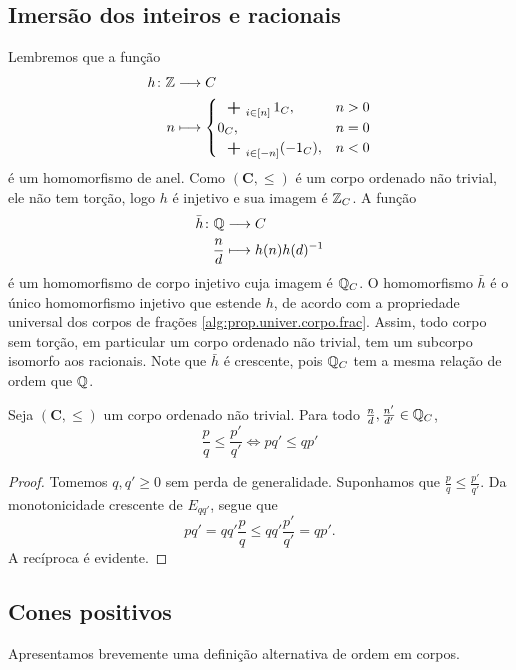 \subsection{Imersão dos inteiros e racionais}

Lembremos que a função
	\begin{align*}
	\func{h}{\Z}{C}{n}{
		\begin{cases}
			\sum_{i \in [n]} 1_C,& n>0 \\
			0_C,& n=0 \\
			\sum_{i \in [-n]} (-1_C),& n<0
		\end{cases}
	}
	\end{align*}
é um homomorfismo de anel. Como $(\bm C,\leq)$ é um corpo ordenado não trivial, ele não tem torção, logo $h$ é injetivo e sua imagem é $\mathbb{Z}_C$. A função
	\begin{align*}
	{\bar h}\colon {\mathbb{Q}} &\longrightarrow {C} \\{\frac{n}{d}} &\longmapsto h(n)h(d)^{-1}
	\end{align*}
é um homomorfismo de corpo injetivo cuja imagem é $\mathbb{Q}_C$. O homomorfismo $\bar h$ é o único homomorfismo injetivo que estende $h$, de acordo com a propriedade universal dos corpos de frações \ref{alg:prop.univer.corpo.frac}. Assim, todo corpo sem torção, em particular um corpo ordenado não trivial, tem um subcorpo isomorfo aos racionais. 	Note que $\bar h$ é crescente, pois $\mathbb{Q}_C$ tem a mesma relação de ordem que $\mathbb{Q}$.

\begin{proposition}
Seja $(\bm C,\leq)$ um corpo ordenado não trivial. Para todo $\frac{n}{d},\frac{n'}{d'} \in \mathbb{Q}_C$,
	\begin{equation*}
	\frac{p}{q} \leq \frac{p'}{q'} \Leftrightarrow pq' \leq qp'
	\end{equation*}
\end{proposition}
\begin{proof}
Tomemos $q,q' \geq 0$ sem perda de generalidade. Suponhamos que $\frac{p}{q} \leq \frac{p'}{q'}$. Da monotonicidade crescente de $E_{qq'}$, segue que
	\begin{equation*}
	pq' = qq'\frac{p}{q} \leq qq'\frac{p'}{q'} = qp'.
	\end{equation*}
A recíproca é evidente.
\end{proof}


\subsection{Cones positivos}

Apresentamos brevemente uma definição alternativa de ordem em corpos.

